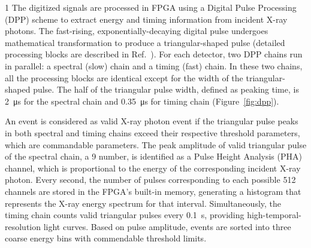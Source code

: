 \documentclass[12pt]{spieman}  %
\begin{document}
\begin{spacing}{1}
The digitized signals are processed in FPGA using a Digital Pulse Processing (DPP) scheme to extract energy and timing information from incident X-ray photons. The fast-rising, exponentially-decaying digital pulse undergoes mathematical transformation to produce a triangular-shaped pulse (detailed processing blocks are described in Ref.~). For each detector, two DPP chains run in parallel: a spectral (slow) chain and a timing (fast) chain. In these two chains, all the processing blocks are identical except for the width of the triangular-shaped pulse. The half of the triangular pulse width, defined as peaking time, is \SI{2}{\micro\second} for the spectral chain and \SI{.35}{\micro\second} for timing chain (Figure~\ref{fig:dpp}). 

An event is considered as valid X-ray photon event if the triangular pulse peaks in both spectral and timing chains exceed their respective threshold parameters, which are commandable parameters. 
The peak amplitude of valid triangular pulse of the spectral chain, a \SI{9}{\bit} number, is identified as a Pulse Height Analysis (PHA) channel, which is proportional to the energy of the corresponding incident X-ray photon. Every second, the number of pulses corresponding to each possible \num{512} channels are stored in the FPGA's built-in memory, generating a histogram that represents the X-ray energy spectrum for that interval.
Simultaneously, the timing chain counts valid triangular pulses every \SI{.1}{\second}, providing high-temporal-resolution light curves. Based on pulse amplitude, events are sorted into three coarse energy bins with commendable threshold limits.


\end{spacing}
\end{document}
